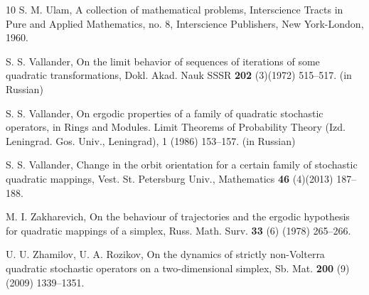 \documentclass[11pt,reqno]{amsart}
\numberwithin{equation}{section} \setcounter{tocdepth}{1}
\begin{document}
\begin{thebibliography}{10}
S. M. Ulam, A collection of mathematical problems, Interscience Tracts in Pure and Applied Mathematics,
no. 8, Interscience Publishers, New York-London, 1960.

S. S. Vallander, On the limit behavior of sequences of iterations of some quadratic transformations,
Dokl. Akad. Nauk SSSR {\bf 202} (3)(1972) 515--517. (in Russian)

 S. S. Vallander, On ergodic properties of a family of quadratic stochastic operators, in Rings and
Modules. Limit Theorems of Probability Theory (Izd. Leningrad. Gos. Univ., Leningrad), 1 (1986)
153--157. (in Russian)

S. S. Vallander, Change in the orbit orientation for a certain family of stochastic quadratic mappings,
Vest. St. Petersburg Univ., Mathematics {\bf 46} (4)(2013) 187--188.

M. I. Zakharevich, On the behaviour of trajectories and the ergodic hypothesis for quadratic mappings
of a simplex, Russ. Math. Surv. {\bf 33} (6) (1978) 265--266.

 U. U. Zhamilov, U. A. Rozikov, On the dynamics of strictly non-Volterra quadratic stochastic
operators on a two-dimensional simplex, Sb. Mat. {\bf 200} (9) (2009) 1339--1351.






\end{thebibliography}
\end{document}
